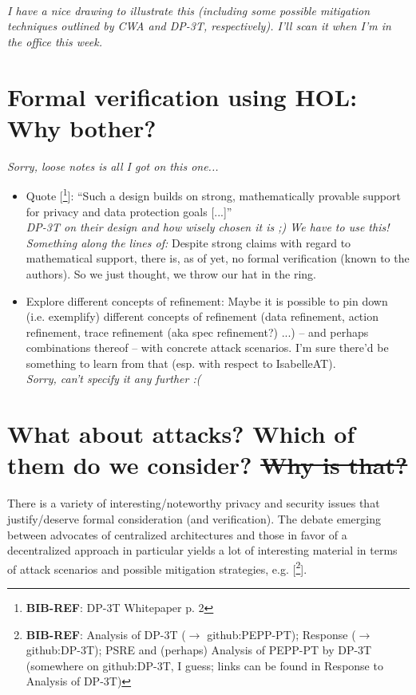 \documentclass{article}
\newcommand*{\TODO}[2][todoC]{{\color{#1} #2}}
\newcommand*{\TODOsty}[2][styC]{\TODO[#1]{#2}}
\newcommand*{\NOTE}[2][noteC]{\TODO[#1]{\textit{#2}}}
\newcommand*{\TODOfn}[2][noteC]{\TODO[#1]{[\footnote{\TODO[#1]{#2}}]}}
\newcommand*{\TODOref}[2][todoC]{\TODOfn[#1]{\textbf{BIB-REF}: #2}}
\begin{document}
\NOTE{%
  \vspace{.25em}\\
  I have a nice drawing to illustrate this (including some possible mitigation techniques outlined by CWA and DP-3T, respectively).
  I'll scan it when I'm in the office this week.}


\section{Formal verification using HOL: Why bother?}
%
\NOTE{%
  Sorry, loose notes is all I got on this one...}
%

\begin{itemize}
\item Quote\TODOref{DP-3T Whitepaper p. 2}:
  ``Such a design builds on strong, mathematically provable support for privacy and data protection goals [...]''\smallskip\\
  \NOTE{DP-3T on their design and how wisely chosen it is ;) We have to use this! Something along the lines of:}
  Despite strong claims with regard to mathematical support, there is, as of yet, no formal verification (known to the authors). \TODOsty{So we just thought, we throw our hat in the ring.}
\item Explore different concepts of refinement: Maybe it is possible to pin down (i.e. exemplify) different concepts of refinement (data refinement, action refinement, trace refinement (aka spec refinement?) ...) -- and perhaps combinations thereof -- with concrete attack scenarios. I'm sure there'd be something to learn from that (esp. with respect to IsabelleAT).\\
  \NOTE{Sorry, can't specify it any further :(}
\end{itemize}


\section{What about attacks? Which of them do we consider? \sout{Why is that?}}
%
There is a variety of \TODOsty{interesting/noteworthy} privacy and security issues that \TODOsty{justify/deserve} \TODOsty{formal consideration} (and verification). The debate emerging between advocates of centralized architectures and those in favor of a decentralized approach in particular yields a lot of \TODOsty{interesting material} in terms of attack scenarios and possible mitigation strategies, e.g. \TODOref{Analysis of DP-3T ($\rightarrow$ github:PEPP-PT); Response ($\rightarrow$ github:DP-3T); PSRE and (perhaps) Analysis of PEPP-PT by DP-3T (somewhere on github:DP-3T, I guess; links can be found in Response to Analysis of DP-3T)}.
\end{document}
